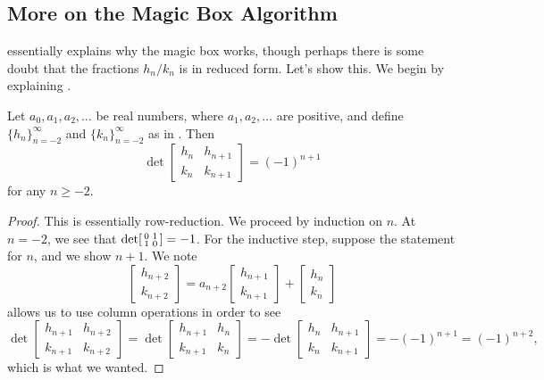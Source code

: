 \documentclass[../notes.tex]{subfiles}
\begin{document}
\subsection{More on the Magic Box Algorithm}
 essentially explains why the magic box works, though perhaps there is some doubt that the fractions $h_n/k_n$ is in reduced form. Let's show this. We begin by explaining .
\begin{corollary} \label{cor:magic-box-minor}
	Let $a_0,a_1,a_2,\ldots$ be real numbers, where $a_1,a_2,\ldots$ are positive, and define $\{h_n\}_{n=-2}^\infty$ and $\{k_n\}_{n=-2}^\infty$ as in . Then
	\[\det\begin{bmatrix}
		h_n & h_{n+1} \\
		k_n & k_{n+1}
	\end{bmatrix}=(-1)^{n+1}\]
	for any $n\ge-2$.
\end{corollary}
\begin{proof}
	This is essentially row-reduction. We proceed by induction on $n$. At $n=-2$, we see that $\det\begin{bsmallmatrix}
		0 & 1 \\
		1 & 0
	\end{bsmallmatrix}=-1$. For the inductive step, suppose the statement for $n$, and we show $n+1$. We note
	\[\begin{bmatrix}
		h_{n+2} \\
		k_{n+2}
	\end{bmatrix}=a_{n+2}\begin{bmatrix}
		h_{n+1} \\
		k_{n+1}
	\end{bmatrix}+\begin{bmatrix}
		h_n \\
		k_n
	\end{bmatrix}\]
	allows us to use column operations in order to see
	\[\det\begin{bmatrix}
		h_{n+1} & h_{n+2} \\
		k_{n+1} & k_{n+2}
	\end{bmatrix}=\det\begin{bmatrix}
		h_{n+1} & h_{n} \\
		k_{n+1} & k_{n}
	\end{bmatrix}=-\det\begin{bmatrix}
		h_{n} & h_{n+1} \\
		k_{n} & k_{n+1}
	\end{bmatrix}=-(-1)^{n+1}=(-1)^{n+2},\]
	which is what we wanted.
\end{proof}
\end{document}
